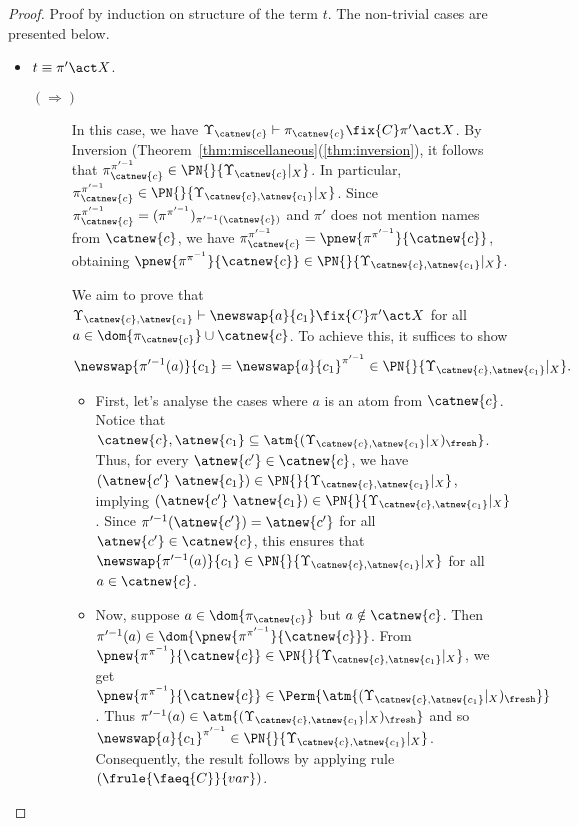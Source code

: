 \begin{proof}
    Proof by induction on structure of the term $t$. The non-trivial cases are presented below.
    \begin{itemize}
        \item $t \equiv \pi'\act X$.

        \begin{description}
            \item[$(\Rightarrow)$] In this case, we have $\Upsilon_{\catnew{c}} \vdash \pi_{\catnew{c}} \fix{C} \pi'\act X$. By Inversion (Theorem~\ref{thm:miscellaneous}(\ref{thm:inversion}), it follows that $\pi_{\catnew{c}}^{\pi'^{-1}} \in \PN{}{\Upsilon_{\catnew{c}}|_X}$. In particular, $\pi_{\catnew{c}}^{\pi'^{-1}} \in \PN{}{\Upsilon_{\catnew{c},\atnew{c_1}}|_X}$. Since $\pi_{\catnew{c}}^{\pi'^{-1}} = (\pi^{\pi'^{-1}})_{\pi'^{-1}(\catnew{c})}$ and $\pi'$ does not mention names from $\catnew{c}$, we have $ \pi_{\catnew{c}}^{\pi'^{-1}} = \pnew{\pi^{\pi'^{-1}}}{\catnew{c}}$, obtaining $\pnew{\pi^{\pi^{-1}}}{\catnew{c}} \in  \PN{}{\Upsilon_{\catnew{c},\atnew{c_1}}|_X}$.

            We aim to prove that $\Upsilon_{\catnew{c},\atnew{c_1}} \vdash \newswap{a}{c_1} \fix{C} \pi'\act X$ for all $a \in \dom{\pi_{\catnew{c}}} \cup \catnew{c}$. To achieve this, it suffices to show
            \[
                \newswap{\pi'^{-1}(a)}{c_1} = \newswap{a}{c_1}^{\pi'^{-1}} \in \PN{}{\Upsilon_{\catnew{c},\atnew{c_1}}|_X}.
            \]

            \begin{itemize}
                \item First, let's analyse the cases where $a$ is an atom from $\catnew{c}$. Notice that $\catnew{c},\atnew{c_1} \subseteq \atm{(\Upsilon_{\catnew{c},\atnew{c_1}}|_X)_{\fresh}}$. Thus, for every $\atnew{c'} \in \catnew{c}$, we have $(\atnew{c'} \ \atnew{c_1}) \in \PN{}{\Upsilon_{\catnew{c},\atnew{c_1}}|_X}$, implying $(\atnew{c'} \ \atnew{c_1}) \in \PN{}{\Upsilon_{\catnew{c},\atnew{c_1}}|_X}$. Since $\pi'^{-1}(\atnew{c'}) = \atnew{c'}$ for all $\atnew{c'} \in \catnew{c}$, this ensures that $\newswap{\pi'^{-1}(a)}{c_1} \in  \PN{}{\Upsilon_{\catnew{c},\atnew{c_1}}|_X}$ for all $a \in \catnew{c}$.

                \item  Now, suppose $a \in \dom{\pi_{\catnew{c}}}$ but $a \notin \catnew{c}$. Then $\pi'^{-1}(a) \in \dom{\pnew{\pi^{\pi'^{-1}}}{\catnew{c}}}$. From $\pnew{\pi^{\pi^{-1}}}{\catnew{c}} \in  \PN{}{\Upsilon_{\catnew{c},\atnew{c_1}}|_X}$, we get $\pnew{\pi^{\pi^{-1}}}{\catnew{c}} \in \Perm{\atm{(\Upsilon_{\catnew{c},\atnew{c_1}}|_X)_{\fresh}}}$. Thus $\pi'^{-1}(a) \in \atm{(\Upsilon_{\catnew{c},\atnew{c_1}}|_X)_{\fresh}}$ and so $\newswap{a}{c_1}^{\pi'^{-1}} \in \PN{}{\Upsilon_{\catnew{c},\atnew{c_1}}|_X}$. Consequently, the result follows by applying rule $(\frule{\faeq{C}}{var})$.
            \end{itemize}



\end{description}
\end{itemize}
\end{proof}
